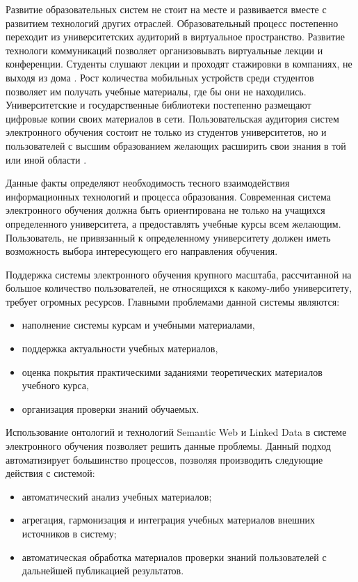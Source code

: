Развитие образовательных систем не стоит на месте и развивается вместе с развитием технологий других отраслей. Образовательный процесс постепенно переходит из университетских аудиторий в виртуальное пространство. Развитие технологи коммуникаций позволяет организовывать виртуальные лекции и конференции. Студенты слушают лекции и проходят стажировки в компаниях, не выходя из дома \cite{masie2012connecting}. Рост количества мобильных устройств среди студентов позволяет им получать учебные материалы, где бы они не находились. Университетские и государственные библиотеки постепенно размещают цифровые копии своих материалов в сети. Пользовательская аудитория систем электронного обучения состоит не только из студентов университетов, но и пользователей с высшим образованием желающих расширить свои знания в той или иной области \cite{oblinger2010campus}. 

Данные факты определяют необходимость тесного взаимодействия информационных технологий и процесса образования. Современная система электронного обучения должна быть ориентирована не только на учащихся определенного университета, а предоставлять учебные курсы всем желающим. Пользователь, не привязанный к определенному университету должен иметь возможность выбора интересующего его направления обучения. 

Поддержка системы электронного обучения крупного масштаба, рассчитанной на большое количество пользователей, не относящихся к какому-либо университету, требует огромных ресурсов. Главными проблемами данной системы являются: 

\begin{itemize}
\item наполнение системы курсам и учебными материалами,
\item поддержка актуальности учебных материалов, 
\item оценка покрытия практическими заданиями теоретических материалов учебного курса,
\item организация проверки знаний обучаемых.
\end{itemize}

Использование онтологий и технологий Semantic Web и Linked Data в системе электронного обучения позволяет решить данные проблемы. Данный подход автоматизирует большинство процессов, позволяя производить следующие действия с системой:

\begin{itemize}
\item автоматический анализ учебных материалов;
\item агрегация, гармонизация и интеграция учебных материалов внешних источников в систему;
\item автоматическая обработка материалов проверки знаний пользователей с дальнейшей публикацией результатов. 
\end{itemize}


